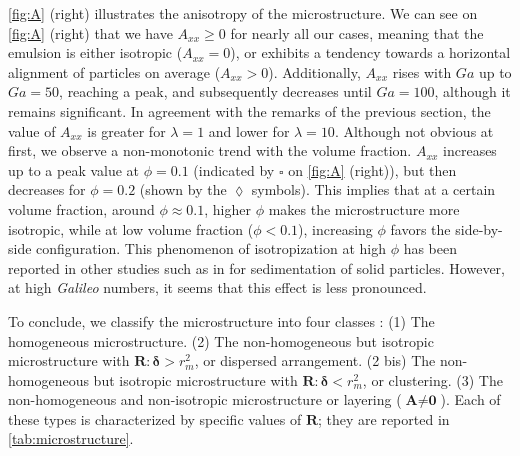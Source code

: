 \ref{fig:A} (right) illustrates the anisotropy of the microstructure. We can see on \ref{fig:A} (right) that we have $A_{xx} \ge 0$ for nearly all our cases, meaning that the emulsion is either isotropic ($A_{xx} = 0$), or exhibits a tendency towards a horizontal alignment of particles on average ($A_{xx} >0$). %
Additionally, $A_{xx}$ rises with $Ga$ up to $Ga = 50$, reaching a peak, and subsequently decreases until $Ga = 100$, although it remains significant.
In agreement with the remarks of the previous section, the value of $A_{xx}$ is greater for $\lambda = 1$ and lower for  $\lambda = 10$.
Although not obvious at first, we observe a non-monotonic trend with the volume fraction. $A_{xx}$ increases up to a peak value at $\phi = 0.1$ (indicated by \textcolor{col3}{$\pmb\square$} on \ref{fig:A} (right)), but then decreases for $\phi=0.2$ (shown by the \textcolor{col4}{$\pmb\lozenge$} symbols). %
This implies that at a certain volume fraction, around $\phi \approx 0.1$, higher $\phi$ makes the microstructure more isotropic, while at low volume fraction ($\phi < 0.1$), increasing $\phi$ favors the side-by-side configuration.
This phenomenon of isotropization at high $\phi$ has been reported in other studies such as in \citet{seyed2021sedimentation} for sedimentation of solid particles. 
However, at high \textit{Galileo} numbers, it seems that this effect is less pronounced. 


To conclude, we classify the microstructure into four classes :
(1) The homogeneous microstructure.
(2) The non-homogeneous but isotropic microstructure with $\textbf{R}:\bm\delta > r_m^2$, or dispersed arrangement. %
(2 bis) The non-homogeneous but isotropic microstructure with $\textbf{R}:\bm\delta < r_m^2$, or clustering. 
(3) The non-homogeneous and non-isotropic microstructure or layering ($\textbf{A}\neq \textbf{0}$). 
Each of these types is characterized by specific values of $\textbf{R}$; they are reported in \ref{tab:microstructure}. 

